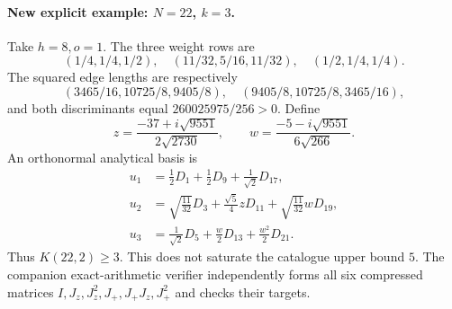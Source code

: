 \documentclass[11pt]{article}
\begin{document}
\paragraph{New explicit example: $N=22$, $k=3$.}
Take $h=8,o=1$. The three weight rows are
\[
 (1/4,1/4,1/2),\quad(11/32,5/16,11/32),\quad(1/2,1/4,1/4).
\]
The squared edge lengths are respectively
\[
 (3465/16,10725/8,9405/8),\quad(9405/8,10725/8,3465/16),
\]
and both discriminants equal $260025975/256>0$.
Define
\[
 z=\frac{-37+i\sqrt{9551}}{2\sqrt{2730}},\qquad
 w=\frac{-5-i\sqrt{9551}}{6\sqrt{266}}.
\]
An orthonormal analytical basis is
\begin{align*}
 u_1&=\tfrac12D_1+\tfrac12D_9+\tfrac1{\sqrt2}D_{17},\\
 u_2&=\sqrt{\tfrac{11}{32}}D_3+\tfrac{\sqrt5}{4}zD_{11}
       +\sqrt{\tfrac{11}{32}}wD_{19},\\
 u_3&=\tfrac1{\sqrt2}D_5+\tfrac w2D_{13}+\tfrac{w^2}{2}D_{21}.
\end{align*}
Thus $K(22,2)\ge3$. This does not saturate the catalogue upper bound $5$.
The companion exact-arithmetic verifier independently forms all six
compressed matrices $I,J_z,J_z^2,J_+,J_+J_z,J_+^2$ and checks their targets.
\end{document}
